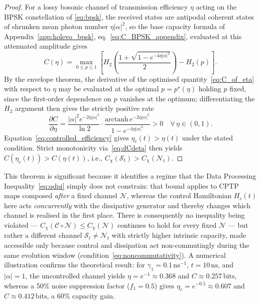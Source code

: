 \documentclass[journal,twocolumn]{IEEEtran}
\theoremstyle{definition}
\theoremstyle{plain}
\begin{document}
\begin{proof}
For a lossy bosonic channel of transmission efficiency $\eta$
acting on the BPSK constellation of \eqref{eq:bpsk}, the received
states are antipodal coherent states of shrunken mean photon number
$\eta|\alpha|^2$, so the base capacity formula of
Appendix~\ref{app:holevo_bpsk}, eq.~\eqref{eq:C_BPSK_appendix},
evaluated at this attenuated amplitude gives
\begin{equation}
  C(\eta) = \max_{0\le p\le 1}\!\left[
    H_2\!\left(\frac{1+\sqrt{1-e^{-4\eta|\alpha|^2}}}{2}\right)
    - H_2(p)\right].
  \label{eq:C_of_eta}
\end{equation}
By the envelope theorem, the derivative of the optimised
quantity~\eqref{eq:C_of_eta} with respect to $\eta$ may be evaluated
at the optimal $p=p^\star(\eta)$ holding $p$ fixed, since the
first-order dependence on $p$ vanishes at the optimum; differentiating
the $H_2$ argument then gives the strictly positive rate
\begin{equation}
  \frac{\partial C}{\partial\eta} =
  \frac{|\alpha|^2 e^{-2\eta|\alpha|^2}}{\ln 2} \cdot
  \frac{\mathrm{arctanh}\, e^{-2\eta|\alpha|^2}}
       {1 - e^{-4\eta|\alpha|^2}} > 0
  \quad \forall\, \eta \in (0,1).
  \label{eq:dCdeta}
\end{equation}
Equation~\eqref{eq:controlled_efficiency} gives $\eta_c(t) > \eta(t)$
under the stated condition.  Strict monotonicity
via~\eqref{eq:dCdeta} then yields
$C(\eta_c(t)) > C(\eta(t))$, i.e., $C_\chi(\mathcal{S}_t) >
C_\chi(\mathcal{N}_t)$.
\end{proof}

This theorem is significant because it identifies a regime that the
Data Processing Inequality~\eqref{eq:qdpi} simply does not
constrain: that bound applies to CPTP maps composed \emph{after} a
fixed channel $\mathcal N$, whereas the control Hamiltonian $H_c(t)$
here acts \emph{concurrently} with the dissipative generator and
thereby changes which channel is realised in the first place. There
is consequently no inequality being violated --- $C_\chi(\mathcal
C\circ\mathcal N)\le C_\chi(\mathcal N)$ continues to hold for every
fixed $\mathcal N$ --- but rather a different channel $\mathcal S_t
\ne \mathcal N_t$ with strictly higher intrinsic capacity, made
accessible only because control and dissipation act non-commutingly
during the same evolution window (condition~\eqref{eq:noncommutativity}).
A numerical illustration confirms the theoretical
result: for $\gamma_1 = 0.1\,\mathrm{ns}^{-1}$, $t =
10\,\mathrm{ns}$, and $|\alpha|=1$, the uncontrolled channel yields
$\eta = e^{-1} \approx 0.368$ and $C \approx 0.257\,\mathrm{bits}$,
whereas a 50\% noise suppression factor ($f_1 = 0.5$) gives
$\eta_c = e^{-0.5} \approx 0.607$ and $C \approx 0.412\,\mathrm{bits}$,
a 60\% capacity gain.
\end{document}
